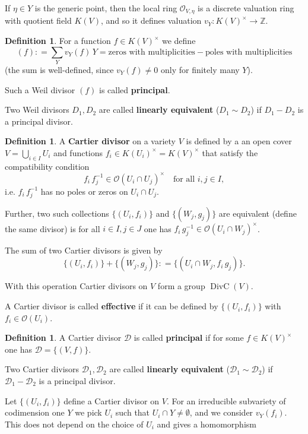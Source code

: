 \documentclass{article}
\theoremstyle{definition}
\newtheorem{definition}[proposition]{Definition}
\DeclareMathOperator{\DivC}{DivC}
\newcommand{\term}{\textbf}
\newcommand{\dfn}{\mathrel{\mathop:}=}
\newcommand{\ZZ}{\mathbb{Z}}
\renewcommand{\O}{\mathcal{O}}
\begin{document}
If $\eta \in Y$ is the generic point, then the local ring $\O_{V,\eta}$ is a
discrete valuation ring with quotient field $K (V)$, and so it defines valuation
$v_Y\colon K (V)^\times \to \ZZ$.

\begin{definition}
  For a function $f \in K (V)^\times$ we define
  $$(f) \dfn \sum_Y v_Y (f) \, Y = \boxed{\text{zeros with multiplicities}} - \boxed{\text{poles with multiplicities}}$$
  (the sum is well-defined, since $v_Y (f) \ne 0$ only for finitely many $Y$).

  Such a Weil divisor $(f)$ is called \term{principal}.

  Two Weil divisors $D_1, D_2$ are called \term{linearly equivalent}
  ($D_1\sim D_2$) if $D_1-D_2$ is a principal divisor.
\end{definition}

\begin{definition}
  A \term{Cartier divisor} on a variety $V$ is defined by a an open cover
  $V = \bigcup_{i\in I} U_i$ and functions
  $f_i \in K (U_i)^\times = K (V)^\times$ that satisfy the compatibility
  condition
  $$f_i\,f_j^{-1} \in \O (U_i\cap U_j)^\times \quad \text{for all }i,j\in I,$$
  i.e. $f_i\,f_j^{-1}$ has no poles or zeros on $U_i\cap U_j$.

  Further, two such collections $\{ (U_i,f_i) \}$ and $\{ (W_j,g_j) \}$ are
  equivalent (define the same divisor) is for all $i\in I, j\in J$ one has
  $f_i\,g_j^{-1} \in \O (U_i \cap W_j)^\times$.

  The sum of two Cartier divisors is given by
  $$\{ (U_i,f_i) \} + \{ (W_j,g_j) \} \dfn \{ (U_i\cap W_j, f_i\,g_j) \}.$$

  With this operation Cartier divisors on $V$ form a group $\DivC (V)$.

  A Cartier divisor is called \term{effective} if it can be defined by
  $\{ (U_i,f_i) \}$ with $f_i \in \O (U_i)$.
\end{definition}

\begin{definition}
  A Cartier divisor $\mathcal{D}$ is called \term{principal} if for some
  $f \in K (V)^\times$ one has $\mathcal{D} = \{ (V,f) \}$.

  Two Cartier divisors $\mathcal{D}_1, \mathcal{D}_2$ are called
  \term{linearly equivalent} ($\mathcal{D}_1 \sim \mathcal{D}_2$) if
  $\mathcal{D}_1 - \mathcal{D}_2$ is a principal divisor.
\end{definition}

Let $\{ (U_i,f_i) \}$ define a Cartier divisor on $V$. For an irreducible
subvariety of codimension one $Y$ we pick $U_i$ such that
$U_i\cap Y \ne \emptyset$, and we consider $v_Y (f_i)$. This does not depend on
the choice of $U_i$ and gives a homomorphism
\end{document}
